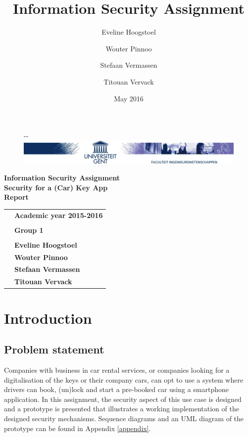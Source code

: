 \documentclass[12pt,a4paper, oneside]{article}
\author{Eveline Hoogstoel \and Wouter Pinnoo \and Stefaan Vermassen \and Titouan Vervack}
\date{May 2016}
\title{Information Security Assignment}
\begin{document}
\begin{titlepage}

\begin{figure}[!ht]
  \begin{adjustwidth}{-\oddsidemargin-1in}{-\rightmargin}
    \centering
    \includegraphics[width=\paperwidth]{assets/banner}
  \end{adjustwidth}
\end{figure}
\vspace{-0.2em}
\begin{center}
\vspace{7cm}
\Huge \textbf{Information Security Assignment\\\LARGE{Security for a (Car) Key App}\\\Large{Report}}\\
\vspace{6.0cm}
\large
\begin{tabular}{Y! {} Z}
& {\bf Academic year 2015-2016} \\
& \\
& {\bf Group 1} \\
&\\
& {\bf Eveline Hoogstoel} \\
& {\bf Wouter Pinnoo} \\
& {\bf Stefaan Vermassen} \\
& {\bf Titouan Vervack} \\
\end{tabular}
\end{center}
\end{titlepage}

\restoregeometry
{}

\pagestyle{fancy}
\fancyhf{}
\cfoot{\thepage}

\clearpage
\tableofcontents
\clearpage
\section{Introduction}
\subsection{Problem statement}
Companies with business in car rental services, or companies looking for a digitalisation of the keys or their company cars, can opt to use a system where drivers can book, (un)lock and start a pre-booked car using a smartphone application. In this assignment, the security aspect of this use case is designed and a prototype is presented that illustrates a working implementation of the designed security mechanisms. Sequence diagrams and an UML diagram of the prototype can be found in Appendix \ref{appendix}.
\end{document}
